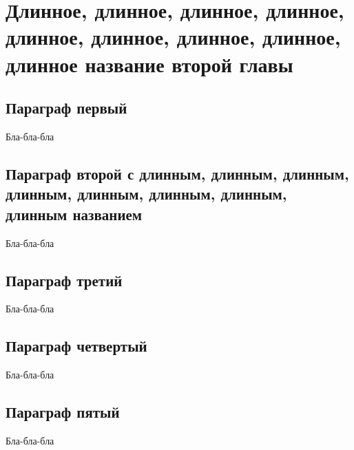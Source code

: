 \chapter{Длинное, длинное, длинное, длинное, длинное, длинное, длинное, длинное, длинное название второй главы} \label{chapt2}

\section{Параграф первый} \label{sect2_0}

Бла-бла-бла


\section{Параграф второй с длинным, длинным, длинным, длинным, длинным, длинным, длинным, длинным названием} \label{sect2_1}
Бла-бла-бла


\section{Параграф третий} \label{sect2_1_experiment}
Бла-бла-бла


\section{Параграф четвертый} \label{sect2_2}
Бла-бла-бла

\section{Параграф пятый} \label{sect2_3}
Бла-бла-бла

\clearpage